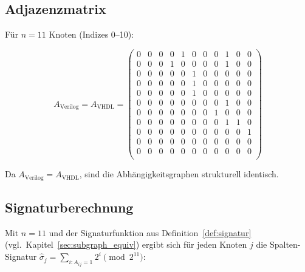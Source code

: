 ﻿\documentclass[12pt,a4paper]{report}
\begin{document}
\subsection{Adjazenzmatrix}

Für $n = 11$ Knoten (Indizes 0--10):

\[
A_\mathrm{Verilog} = A_\mathrm{VHDL} =
\begin{pmatrix}
	0& 0& 0& 0& 1& 0& 0& 0& 1& 0& 0 \\ %
	0& 0& 0& 1& 0& 0& 0& 0& 1& 0& 0 \\ %
	0& 0& 0& 0& 0& 1& 0& 0& 0& 0& 0 \\ %
	0& 0& 0& 0& 0& 1& 0& 0& 0& 0& 0 \\ %
	0& 0& 0& 0& 0& 1& 0& 0& 0& 0& 0 \\ %
	0& 0& 0& 0& 0& 0& 0& 0& 1& 0& 0 \\ %
	0& 0& 0& 0& 0& 0& 0& 1& 0& 0& 0 \\ %
	0& 0& 0& 0& 0& 0& 0& 0& 1& 1& 0 \\ %
	0& 0& 0& 0& 0& 0& 0& 0& 0& 0& 1 \\ %
	0& 0& 0& 0& 0& 0& 0& 0& 0& 0& 0 \\ %
	0& 0& 0& 0& 0& 0& 0& 0& 0& 0& 0 \\ %
\end{pmatrix}
\]

Da $A_\mathrm{Verilog} = A_\mathrm{VHDL}$, sind die Abhängigkeitsgraphen
strukturell identisch.

\subsection{Signaturberechnung}

Mit $n = 11$ und der Signaturfunktion aus Definition~\ref{def:signatur}
(vgl.\ Kapitel~\ref{sec:subgraph_equiv}) ergibt sich für jeden Knoten $j$ die
Spalten-Signatur $\hat{\sigma}_j = \sum_{i : A_{ij}=1} 2^i \pmod{2^{11}}$:
\end{document}
